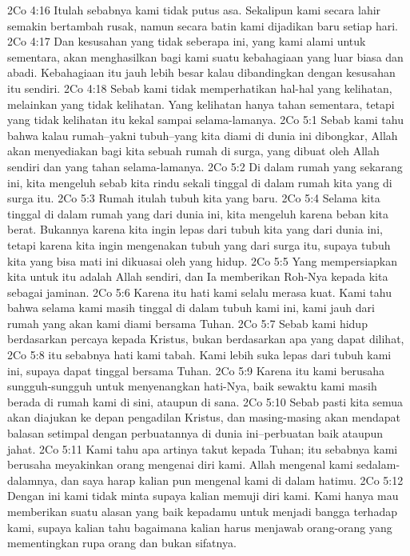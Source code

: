 2Co 4:16  Itulah sebabnya kami tidak putus asa. Sekalipun kami secara lahir semakin bertambah rusak, namun secara batin kami dijadikan baru setiap hari.
2Co 4:17  Dan kesusahan yang tidak seberapa ini, yang kami alami untuk sementara, akan menghasilkan bagi kami suatu kebahagiaan yang luar biasa dan abadi. Kebahagiaan itu jauh lebih besar kalau dibandingkan dengan kesusahan itu sendiri.
2Co 4:18  Sebab kami tidak memperhatikan hal-hal yang kelihatan, melainkan yang tidak kelihatan. Yang kelihatan hanya tahan sementara, tetapi yang tidak kelihatan itu kekal sampai selama-lamanya.
2Co 5:1  Sebab kami tahu bahwa kalau rumah--yakni tubuh--yang kita diami di dunia ini dibongkar, Allah akan menyediakan bagi kita sebuah rumah di surga, yang dibuat oleh Allah sendiri dan yang tahan selama-lamanya.
2Co 5:2  Di dalam rumah yang sekarang ini, kita mengeluh sebab kita rindu sekali tinggal di dalam rumah kita yang di surga itu.
2Co 5:3  Rumah itulah tubuh kita yang baru.
2Co 5:4  Selama kita tinggal di dalam rumah yang dari dunia ini, kita mengeluh karena beban kita berat. Bukannya karena kita ingin lepas dari tubuh kita yang dari dunia ini, tetapi karena kita ingin mengenakan tubuh yang dari surga itu, supaya tubuh kita yang bisa mati ini dikuasai oleh yang hidup.
2Co 5:5  Yang mempersiapkan kita untuk itu adalah Allah sendiri, dan Ia memberikan Roh-Nya kepada kita sebagai jaminan.
2Co 5:6  Karena itu hati kami selalu merasa kuat. Kami tahu bahwa selama kami masih tinggal di dalam tubuh kami ini, kami jauh dari rumah yang akan kami diami bersama Tuhan.
2Co 5:7  Sebab kami hidup berdasarkan percaya kepada Kristus, bukan berdasarkan apa yang dapat dilihat,
2Co 5:8  itu sebabnya hati kami tabah. Kami lebih suka lepas dari tubuh kami ini, supaya dapat tinggal bersama Tuhan.
2Co 5:9  Karena itu kami berusaha sungguh-sungguh untuk menyenangkan hati-Nya, baik sewaktu kami masih berada di rumah kami di sini, ataupun di sana.
2Co 5:10  Sebab pasti kita semua akan diajukan ke depan pengadilan Kristus, dan masing-masing akan mendapat balasan setimpal dengan perbuatannya di dunia ini--perbuatan baik ataupun jahat.
2Co 5:11  Kami tahu apa artinya takut kepada Tuhan; itu sebabnya kami berusaha meyakinkan orang mengenai diri kami. Allah mengenal kami sedalam-dalamnya, dan saya harap kalian pun mengenal kami di dalam hatimu.
2Co 5:12  Dengan ini kami tidak minta supaya kalian memuji diri kami. Kami hanya mau memberikan suatu alasan yang baik kepadamu untuk menjadi bangga terhadap kami, supaya kalian tahu bagaimana kalian harus menjawab orang-orang yang mementingkan rupa orang dan bukan sifatnya.
